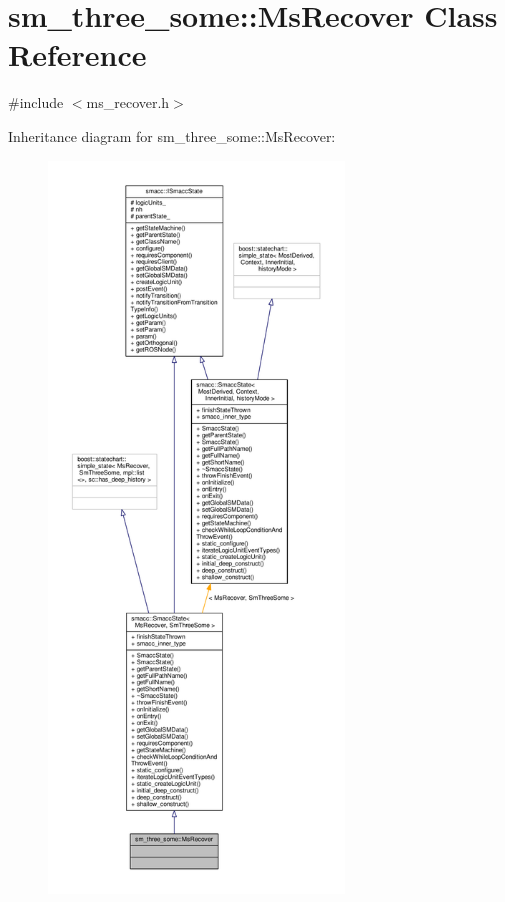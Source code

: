 \hypertarget{classsm__three__some_1_1MsRecover}{}\section{sm\+\_\+three\+\_\+some\+:\+:Ms\+Recover Class Reference}
\label{classsm__three__some_1_1MsRecover}


{\ttfamily \#include $<$ms\+\_\+recover.\+h$>$}



Inheritance diagram for sm\+\_\+three\+\_\+some\+:\+:Ms\+Recover\+:\nopagebreak
\begin{figure}[H]
\begin{center}
\leavevmode
\includegraphics[height=550pt]{classsm__three__some_1_1MsRecover__inherit__graph}
\end{center}
\end{figure}


